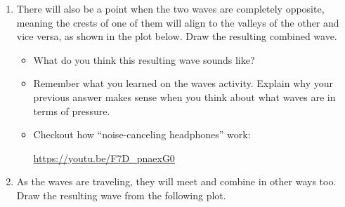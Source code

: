 \documentclass[12pt,noauthor,nooutcomes, instructornotes]{ximera}
\begin{document}
\begin{question}
\begin{enumerate}
\newpage
\item There will also be a point when the two waves are completely opposite, meaning the crests of one of them will align to the valleys of the other and vice versa, as shown in the plot below. Draw the resulting combined wave.
\begin{center}
\end{center}
\begin{itemize}
\item What do you think this resulting wave sounds like?

\answerspace



\item Remember what you learned on the waves activity. Explain why your previous answer makes sense when you think about what waves are in terms of pressure.

\answerspace




\item Checkout how ``noise-canceling headphones'' work:
\begin{center}
\url{https://youtu.be/F7D_pnaexG0}
\end{center}
\end{itemize}

\newpage
\item As the waves are traveling, they will meet and combine in other ways too. Draw the resulting wave from the following plot.
\begin{center}
\end{center}
\end{enumerate}
\end{question}
\end{document}
